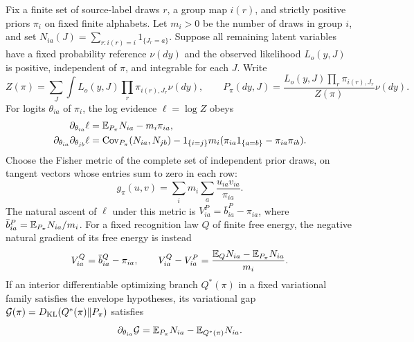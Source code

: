 Fix a finite set of source-label draws $r$, a group map $i(r)$, and strictly
positive priors $\pi_i$ on fixed finite alphabets. Let $m_i>0$ be the number of
draws in group $i$, and set $N_{ia}(J)=\sum_{r:i(r)=i}1_{\{J_r=a\}}$.
Suppose all remaining latent variables have a fixed probability reference
$\nu(dy)$ and the observed likelihood $L_o(y,J)$ is positive, independent of
$\pi$, and integrable for each $J$. Write
\begin{equation}
Z(\pi)=\sum_J\int L_o(y,J)\prod_r\pi_{i(r),J_r}\nu(dy),\qquad
P_\pi(dy,J)=\frac{L_o(y,J)\prod_r\pi_{i(r),J_r}}{Z(\pi)}\nu(dy).
\label{eq:obs-native-source-law}
\end{equation}
For logits $\theta_{ia}$ of $\pi_i$, the log evidence $\ell=\log Z$ obeys
\begin{align}
\partial_{\theta_{ia}}\ell
 &=\mathbb E_{P_\pi}N_{ia}-m_i\pi_{ia},\\
\partial_{\theta_{ia}}\partial_{\theta_{jb}}\ell
 &=\operatorname{Cov}_{P_\pi}(N_{ia},N_{jb})
 -1_{\{i=j\}}m_i(\pi_{ia}1_{\{a=b\}}-\pi_{ia}\pi_{ib}).
\label{eq:obs-native-source-score}
\end{align}
Choose the Fisher metric of the complete set of independent prior draws,
on tangent vectors whose entries sum to zero in each row:
\begin{equation}
g_\pi(u,v)=\sum_i m_i\sum_a\frac{u_{ia}v_{ia}}{\pi_{ia}}.
\label{eq:obs-prefix-source-fisher}
\end{equation}
The natural ascent of $\ell$ under this metric is
$V^P_{ia}=\bar b^P_{ia}-\pi_{ia}$, where
$\bar b^P_{ia}=\mathbb E_{P_\pi}N_{ia}/m_i$. For a fixed recognition law $Q$ of finite
free energy, the negative natural gradient of its free energy is instead
\begin{equation}
V^Q_{ia}=\bar b^Q_{ia}-\pi_{ia},\qquad
V^Q_{ia}-V^P_{ia}=\frac{\mathbb E_QN_{ia}-\mathbb E_{P_\pi}N_{ia}}{m_i}.
\label{eq:obs-native-recognition-drive-gap}
\end{equation}
If an interior differentiable optimizing branch $Q^*(\pi)$ in a fixed
variational family satisfies the envelope hypotheses, its variational gap
$\mathcal G(\pi)=D_{\mathrm{KL}}(Q^*(\pi)\Vert P_\pi)$ satisfies
\begin{equation}
\partial_{\theta_{ia}}\mathcal G
=\mathbb E_{P_\pi}N_{ia}-\mathbb E_{Q^*(\pi)}N_{ia}.
\label{eq:obs-source-gap-derivative}
\end{equation}

